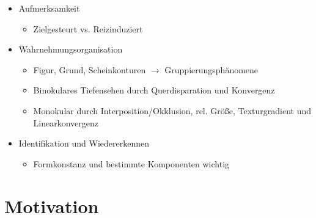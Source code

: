 \documentclass[11pt, paper=a4, twocolumn]{scrartcl}
\begin{document}
\begin{itemize}
		\item Aufmerksamkeit
			\begin{itemize}
				\item Zielgesteurt vs. Reizinduziert
			\end{itemize}

		\item Wahrnehmungsorganisation
			\begin{itemize}
				\item Figur, Grund, Scheinkonturen $\rightarrow$ 
					Gruppierungsphänomene
				\item Binokulares Tiefensehen durch Querdisparation und 
					Konvergenz
				\item Monokular durch Interposition/Okklusion, rel. Größe, 
					Texturgradient und Linearkonvergenz
			\end{itemize}

		\item Identifikation und Wiedererkennen
			\begin{itemize}
				\item Formkonstanz und bestimmte Komponenten wichtig
			\end{itemize}

	\end{itemize}

	\section{Motivation}
\end{document}
